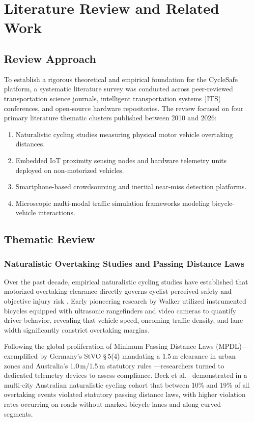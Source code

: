 \chapter{Literature Review and Related Work}
\label{chap:lit_review}

\section{Review Approach}
To establish a rigorous theoretical and empirical foundation for the CycleSafe platform, a systematic literature survey was conducted across peer-reviewed transportation science journals, intelligent transportation systems (ITS) conferences, and open-source hardware repositories. The review focused on four primary literature thematic clusters published between 2010 and 2026:
\begin{enumerate}
    \item Naturalistic cycling studies measuring physical motor vehicle overtaking distances.
    \item Embedded IoT proximity sensing nodes and hardware telemetry units deployed on non-motorized vehicles.
    \item Smartphone-based crowdsourcing and inertial near-miss detection platforms.
    \item Microscopic multi-modal traffic simulation frameworks modeling bicycle-vehicle interactions.
\end{enumerate}

\section{Thematic Review}

\subsection{Naturalistic Overtaking Studies and Passing Distance Laws}
Over the past decade, empirical naturalistic cycling studies have established that motorized overtaking clearance directly governs cyclist perceived safety and objective injury risk \cite{chataway2014passing, dozza2016what}. Early pioneering research by Walker utilized instrumented bicycles equipped with ultrasonic rangefinders and video cameras to quantify driver behavior, revealing that vehicle speed, oncoming traffic density, and lane width significantly constrict overtaking margins. 

Following the global proliferation of Minimum Passing Distance Laws (MPDL)---exemplified by Germany's StVO \S\,5(4) mandating a 1.5\,m clearance in urban zones \cite{stvo2020germany} and Australia's 1.0\,m/1.5\,m statutory rules \cite{beck2019passing}---researchers turned to dedicated telemetry devices to assess compliance. Beck et al.\ \cite{beck2019passing} demonstrated in a multi-city Australian naturalistic cycling cohort that between 10\% and 19\% of all overtaking events violated statutory passing distance laws, with higher violation rates occurring on roads without marked bicycle lanes and along curved segments.

